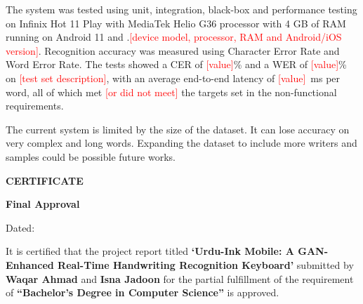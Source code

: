 \documentclass[12pt,a4paper]{report}
\newcommand{\projecttitle}{Urdu-Ink Mobile: A GAN-Enhanced Real-Time Handwriting Recognition Keyboard}
\newcommand{\studentA}{Waqar Ahmad}
\newcommand{\studentB}{Isna Jadoon}
\newcommand{\todo}[1]{\textcolor{red}{[#1]}}
\newcommand{\frontheading}[1]{%
  \begin{center}\bfseries\fontsize{16}{20}\selectfont\MakeUppercase{#1}\end{center}\vspace{8pt}}
\begin{document}
The system was tested using unit, integration, black-box and performance testing on Infinix Hot 11 Play with MediaTek Helio G36 processor with 4 GB of RAM running on Android 11 and .\todo{device model, processor, RAM and Android/iOS version}. Recognition accuracy was measured using Character Error Rate and Word Error Rate. The tests showed a CER of \todo{value}\% and a WER of \todo{value}\% on \todo{test set description}, with an average end-to-end latency of \todo{value}~ms per word, all of which met \todo{or did not meet} the targets set in the non-functional requirements.

The current system is limited by the size of the dataset. It can lose accuracy on very complex and long words. Expanding the dataset to include more writers and samples could be possible future works.

\clearpage

\frontheading{Certificate}
\begin{center}\fontsize{14}{17}\selectfont\textbf{Final Approval}\end{center}
\vspace{4pt}
\noindent Dated: \hrulefill

\vspace{14pt}
\noindent\fontsize{14}{20}\selectfont
It is certified that the project report titled \textbf{`\projecttitle'} submitted by \textbf{\studentA} and \textbf{\studentB} for the partial fulfillment of the requirement of \textbf{``Bachelor's Degree in Computer Science''} is approved.
\end{document}
